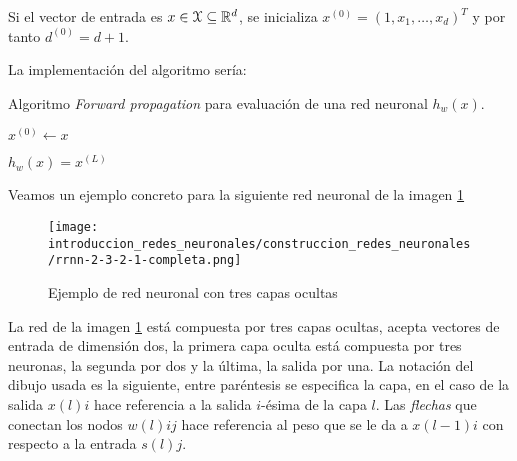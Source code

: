 Si el vector de entrada es $x \in \mathcal{X} \subseteq \mathbb{R}^d$, 
se inicializa  $x^{(0)} = (1,x_1, \ldots, x_d)^T$ y por tanto $d^{(0)} = d+1.$


La implementación del algoritmo sería:

\begin{algorithm}[H]
    \caption{Algoritmo \textit{Forward propagation} para evaluación de una red neuronal $h_w(x)$.}
    \begin{algorithmic}[1]
        \STATE $x^{(0)} \leftarrow x$ 

        \STATE {}
        \STATE $h_w(x) = x^{(L)}$ 
\end{algorithmic}
\end{algorithm}

Veamos un ejemplo concreto para la siguiente red neuronal de la imagen \ref{img:construccion_rrnn:rrnn-2-3-2-1}
\begin{figure}[h!]
    \texttt{[image: introduccion\_redes\_neuronales/construccion\_redes\_neuronales/rrnn-2-3-2-1-completa.png]}
    \caption{Ejemplo de red neuronal con tres capas ocultas}
    \label{img:construccion_rrnn:rrnn-2-3-2-1}
\end{figure} 

La red de la imagen \ref{img:construccion_rrnn:rrnn-2-3-2-1} está 
compuesta por tres capas ocultas, acepta vectores de entrada de dimensión dos, 
la primera capa oculta está compuesta por tres neuronas, 
la segunda por dos y la última, la salida por una. 
La notación del dibujo usada es la siguiente, entre paréntesis se 
especifica la capa, en el caso de la salida $x(l)i$ hace referencia a la salida $i$-ésima de la capa $l$. Las \textit{flechas} que conectan los nodos $w(l)ij$ hace referencia al peso que se le da a $x(l-1)i$ con respecto a la entrada $s(l)j$.

